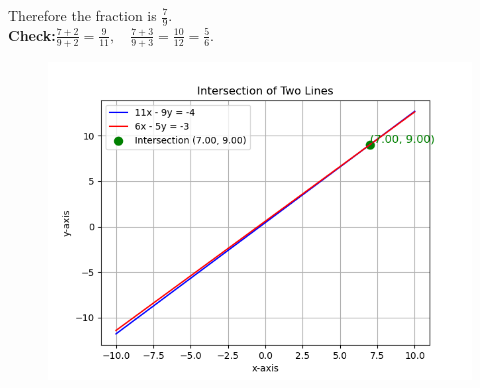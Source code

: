 \documentclass[journal]{IEEEtran}
\begin{document}
Therefore the fraction is \(\boxed{\frac{7}{9}}\).\\[4pt]

\textbf{Check:}\quad \(\frac{7+2}{9+2}=\frac{9}{11},\quad \frac{7+3}{9+3}=\frac{10}{12}=\frac{5}{6}.\)

 \begin{figure}[H]
     \centering
     \includegraphics[width=0.8\columnwidth]{figs/12.png}
     \label{fig:1}
 \end{figure}
\end{document}
